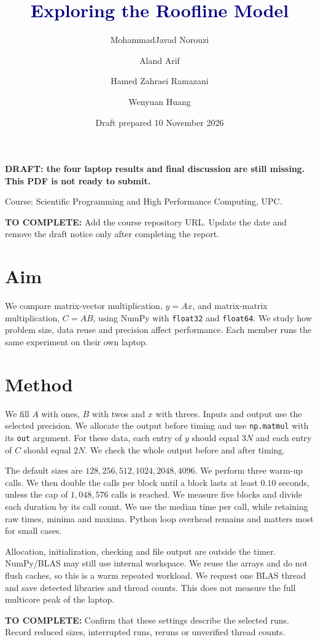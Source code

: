 \documentclass[11pt,a4paper]{article}
\title{\textcolor{navy}{Exploring the Roofline Model}}
\author{MohammadJavad Norouzi \and Aland Arif \and
Hamed Zahraei Ramazani \and Wenyuan Huang}
\date{Draft prepared 10 November 2026}
\newcommand{\todo}[1]{\par\textcolor{rose}{\textbf{TO COMPLETE:} #1}\par}
\begin{document}
\maketitle
\textcolor{rose}{\textbf{DRAFT: the four laptop results and final discussion
are still missing. This PDF is not ready to submit.}}

Course: Scientific Programming and High Performance Computing, UPC.
\todo{Add the course repository URL. Update the date and remove the draft
notice only after completing the report.}

\section{Aim}
We compare matrix-vector multiplication, $y=Ax$, and matrix-matrix
multiplication, $C=AB$, using NumPy with \texttt{float32} and \texttt{float64}.
We study how problem size, data reuse and precision affect performance. Each
member runs the same experiment on their own laptop.

\section{Method}
We fill $A$ with ones, $B$ with twos and $x$ with threes. Inputs and output
use the selected precision. We allocate the output before timing and use
\texttt{np.matmul} with its \texttt{out} argument. For these data, each entry
of $y$ should equal $3N$ and each entry of $C$ should equal $2N$. We check the
whole output before and after timing.

The default sizes are $128,256,512,1024,2048,4096$. We perform three warm-up
calls. We then double the calls per block until a block lasts at least
$0.10$ seconds, unless the cap of $1{,}048{,}576$ calls is reached. We measure
five blocks and divide each duration by its call count. We use the median
time per call, while retaining raw times, minima and maxima. Python loop
overhead remains and matters most for small cases.

Allocation, initialization, checking and file output are outside the timer.
NumPy/BLAS may still use internal workspace. We reuse the arrays and do not
flush caches, so this is a warm repeated workload. We request one BLAS thread
and save detected libraries and thread counts. This does not measure the
full multicore peak of the laptop.

\todo{Confirm that these settings describe the selected runs. Record reduced
sizes, interrupted runs, reruns or unverified thread counts.}
\end{document}

